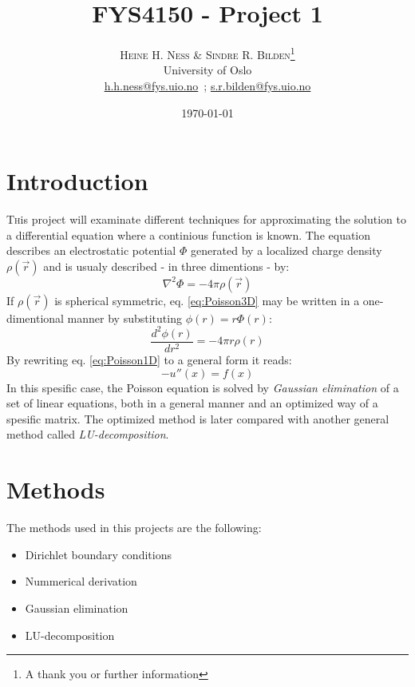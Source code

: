 \documentclass[twoside,twocolumn]{article}
\title{FYS4150 - Project 1} %
\author{%
\textsc{Heine H. Ness \& Sindre R. Bilden}\thanks{A thank you or further information} \\[1ex] %
\normalsize University of Oslo \\ %
\normalsize \href{mailto:h.h.ness@fys.uio.no}{h.h.ness@fys.uio.no}\ ; \href{mailto:s.r.bilden@fys.uio.no}{s.r.bilden@fys.uio.no}%
}
\date{\today} %
\begin{document}
\maketitle


\section{Introduction}

\lettrine[nindent=0em,lines=3]{T}his project will examinate different techniques for approximating the solution to a differential equation where a continious function is known. The equation describes an electrostatic potential $\Phi$ generated by a localized charge density $\rho(\vec{r})$ and is usualy described - in three dimentions - by:
\begin{equation}
\nabla^2\Phi = -4\pi \rho(\vec{r}) \label{eq:Poisson3D}
\end{equation}
If $\rho(\vec{r})$ is spherical symmetric, eq. \ref{eq:Poisson3D} may be written in a one-dimentional manner by substituting $\phi(r)=r\Phi(r)$:
\begin{equation}
\frac{d^2\phi(r)}{dr^2}=-4\pi r\rho(r) \label{eq:Poisson1D}
\end{equation}
By rewriting eq. \ref{eq:Poisson1D} to a general form it reads:
\begin{equation}
-u''(x)=f(x)
\end{equation}
In this spesific case, the Poisson equation is solved by \textit{Gaussian elimination} of a set of linear equations, both in a general manner and an optimized way of a spesific matrix. The optimized method is later compared with another general method called \textit{LU-decomposition}.


\section{Methods}
The methods used in this projects are the following:
\begin{itemize}
\item Dirichlet boundary conditions
\item Nummerical derivation
\item Gaussian elimination
\item LU-decomposition
\end{itemize}
\end{document}
